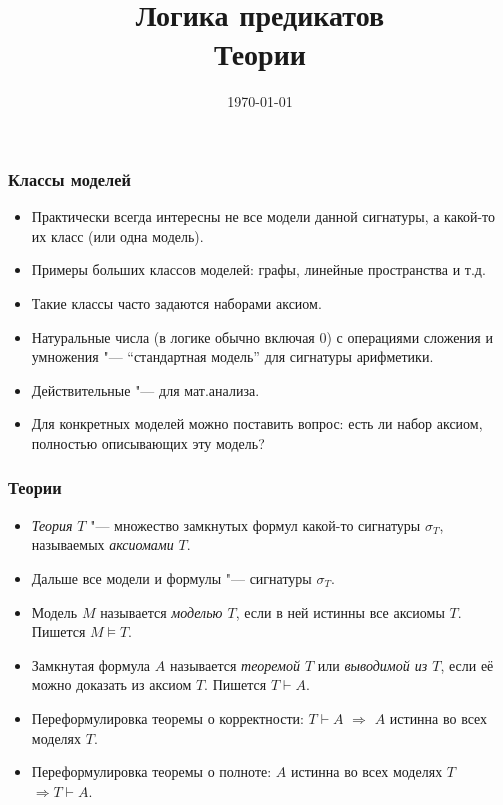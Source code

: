 \documentclass[10pt]{beamer}
\title{Логика предикатов\\Теории}
\date{\today}
\begin{document}
\begin{frame}[plain]
\maketitle
\end{frame}

\begin{frame}
\frametitle{Классы моделей}
\begin{itemize}
    \item Практически всегда интересны не все модели данной сигнатуры, а какой-то их класс (или одна модель).
    \item Примеры больших классов моделей: графы, линейные пространства и т.д.
    \item Такие классы часто задаются наборами аксиом.
    \item Натуральные числа (в логике обычно включая $0$) с операциями сложения и умножения "--- \enquote{стандартная модель} для сигнатуры арифметики.
    \item Действительные "--- для мат.анализа.
    \item Для конкретных моделей можно поставить вопрос: есть ли набор аксиом, полностью описывающих эту модель?
\end{itemize}
\end{frame}

\begin{frame}
    \frametitle{Теории}
    \begin{itemize}
        \item \emph{Теория} $T$ "--- множество замкнутых формул какой-то сигнатуры $\sigma_T$, называемых \emph{аксиомами} $T$. 
        \item Дальше все модели и формулы "--- сигнатуры $\sigma_T$.
        \pause
        \item Модель $M$ называется \emph{моделью $T$}, если в ней истинны все аксиомы $T$. Пишется $M \vDash T$.
        \pause
        \item Замкнутая формула $A$ называется \emph{теоремой $T$} или \emph{выводимой из $T$}, если её можно доказать из аксиом $T$. Пишется $T \vdash A$.
        \pause
        \item Переформулировка теоремы о корректности: $T \vdash A$ $\Rightarrow$ $A$ истинна во всех моделях $T$.
        \item Переформулировка теоремы о полноте: $A$ истинна во всех моделях $T$ $\Rightarrow T \vdash A$.
    \end{itemize}
\end{frame}
\end{document}
